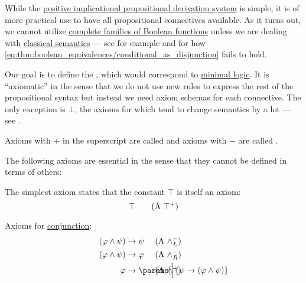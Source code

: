 \begin{definition}\label{def:minimal_propositional_derivation_system}
  While the \hyperref[def:positive_implicational_propositional_derivation_system]{positive implicational propositional derivation system} is simple, it is of more practical use to have all propositional connectives available. As it turns out, we cannot utilize \hyperref[ex:posts_completeness_theorem]{complete families of Boolean functions} unless we are dealing with \hyperref[def:propositional_semantics]{classical semantics} --- see for example  and  for how \cref{eq:thm:boolean_equivalences/conditional_as_disjunction} fails to hold.

  Our goal is to define the , which would correspond to \hyperref[def:minimal_logic]{minimal logic}. It is \enquote{axiomatic} in the sense that we do not use new rules to express the rest of the propositional syntax but instead we need axiom schemas for each connective. The only exception is \hyperref[def:propositional_language/constants/verum]{\( \bot \)}, the axioms for which tend to change semantics by a lot --- see .

  Axioms with \( + \) in the superscript are called  and axioms with \( - \) are called .

  The following axioms are essential in the sense that they cannot be defined in terms of others:
  \begin{thmenum}[series=def:minimal_propositional_derivation_system]
     The simplest axiom states that the constant \hyperref[def:propositional_language/constants/verum]{\( \top \)} is itself an axiom:
    \begin{equation}\label{eq:def:minimal_propositional_derivation_system/top/intro}
      \top \tag{\textrm{A} \( \top^+ \)}
    \end{equation}

     Axioms for \hyperref[def:propositional_language/connectives/conjunction]{conjunction}:
    \begin{align}
      \mathllap{ (\varphi \wedge \psi) } &\rightarrow \mathrlap{ \psi } \tag{\textrm{A} \( \wedge_L^- \)} \label{eq:def:minimal_propositional_derivation_system/and/elim_left} \\
      \mathllap{ (\varphi \wedge \psi) } &\rightarrow \mathrlap{ \varphi } \tag{\textrm{A} \( \wedge_R^- \)} \label{eq:def:minimal_propositional_derivation_system/and/elim_right} \\
      \mathllap{ \varphi }               &\rightarrow \mathrlap{ \parens[\Big]{ \psi \rightarrow (\varphi \wedge \psi) } } \tag{\textrm{A} \( \wedge^+ \)} \label{eq:def:minimal_propositional_derivation_system/and/intro}
    \end{align}


\end{thmenum}
\end{definition}
